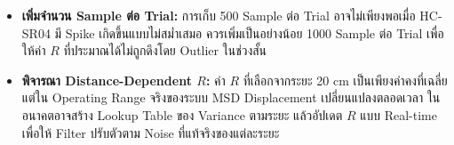 \begin{itemize}
    \item \textbf{เพิ่มจำนวน Sample ต่อ Trial:} การเก็บ 500 Sample ต่อ Trial อาจไม่เพียงพอเมื่อ HC-SR04 มี Spike เกิดขึ้นแบบไม่สม่ำเสมอ ควรเพิ่มเป็นอย่างน้อย 1000 Sample ต่อ Trial เพื่อให้ค่า $R$ ที่ประมาณได้ไม่ถูกดึงโดย Outlier ในช่วงสั้น
    \item \textbf{พิจารณา Distance-Dependent $R$:} ค่า $R$ ที่เลือกจากระยะ 20 cm เป็นเพียงค่าคงที่เฉลี่ย แต่ใน Operating Range จริงของระบบ MSD Displacement เปลี่ยนแปลงตลอดเวลา ในอนาคตอาจสร้าง Lookup Table ของ Variance ตามระยะ แล้วอัปเดต $R$ แบบ Real-time เพื่อให้ Filter ปรับตัวตาม Noise ที่แท้จริงของแต่ละระยะ
\end{itemize}